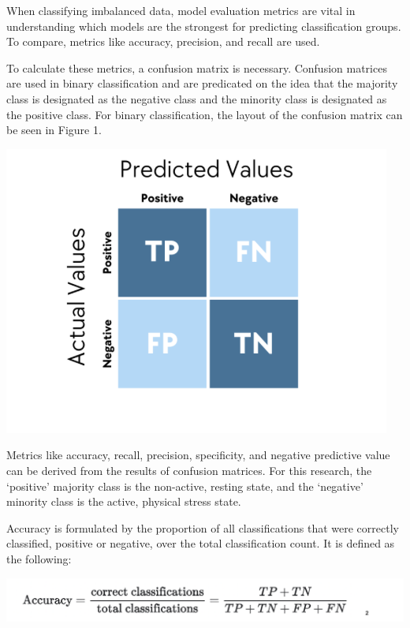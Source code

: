 \documentclass{article}
\begin{document}
When classifying imbalanced data, model evaluation metrics are vital in understanding which models are the strongest for predicting classification groups. To compare, metrics like accuracy, precision, and recall are used.

To calculate these metrics, a confusion matrix is necessary. Confusion matrices are used in binary classification and are predicated on the idea that the majority class is designated as the negative class and the minority class is designated as the positive class. For binary classification, the layout of the confusion matrix can be seen in Figure 1. 

\begin{center}
    \includegraphics[scale = .75]{images/CM.png}
\end{center}

Metrics like accuracy, recall, precision, specificity, and negative predictive value can be derived from the results of confusion matrices. For this research, the ‘positive’ majority class is the non-active, resting state, and the ‘negative’ minority class is the active, physical stress state. 

Accuracy is formulated by the proportion of all classifications that were correctly classified, positive or negative, over the total classification count. It is defined as the following: 

\begin{center}
    \includegraphics[scale=.45]{images/ACCURACY.png}
\end{center}
\end{document}
